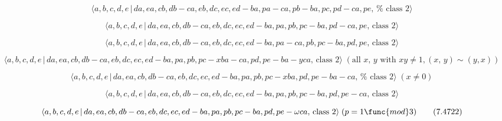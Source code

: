 \documentclass[10pt]{article}
\begin{document}
\begin{equation}
\langle
a,b,c,d,e\,|\,da,ea,cb,db-ca,eb,dc,ec,ed-ba,pa-ca,pb-ba,pc,pd-ca,pe,\,\text{%
class }2\rangle  \tag{7.4716}
\end{equation}

\begin{equation}
\langle a,b,c,d,e\,|\,da,ea,cb,db-ca,eb,dc,ec,ed-ba,pa,pb,pc-ba,pd-ca,pe,\,%
\text{class }2\rangle  \tag{7.4717}
\end{equation}

\begin{equation}
\langle a,b,c,d,e\,|\,da,ea,cb,db-ca,eb,dc,ec,ed-ba,pa-ca,pb,pc-ba,pd,pe,\,%
\text{class }2\rangle  \tag{7.4718}
\end{equation}

\begin{equation}
\langle
a,b,c,d,e\,|\,da,ea,cb,db-ca,eb,dc,ec,ed-ba,pa,pb,pc-xba-ca,pd,pe-ba-yca,\,%
\text{class }2\rangle \;(\text{all }x,\,y\text{ with }xy\neq 1,(x,\,y)\sim
(y,x))  \tag{7.4719}
\end{equation}

\begin{equation}
\langle
a,b,c,d,e\,|\,da,ea,cb,db-ca,eb,dc,ec,ed-ba,pa,pb,pc-xba,pd,pe-ba-ca,\,\text{%
class }2\rangle \;(x \neq 0)  \tag{7.4720}
\end{equation}

\begin{equation}
\langle a,b,c,d,e\,|\,da,ea,cb,db-ca,eb,dc,ec,ed-ba,pa,pb,pc-ba,pd,pe-ca,\,%
\text{class }2\rangle  \tag{7.4721}
\end{equation}

\begin{equation}
\langle a,b,c,d,e\,|\,da,ea,cb,db-ca,eb,dc,ec,ed-ba,pa,pb,pc-ba,pd,pe-\omega
ca,\,\text{class }2\rangle \;(p=1\func{mod}3)  \tag{7.4722}
\end{equation}
\end{document}
